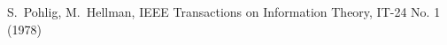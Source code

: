 \documentclass[USenglish,oneside,twocolumn]{article}
\begin{document}
\begin{thebibliography}{99}
 S.~Pohlig, M.~Hellman, IEEE Transactions on Information Theory, IT-24 No. 1 (1978)

\end{thebibliography}
\end{document}
